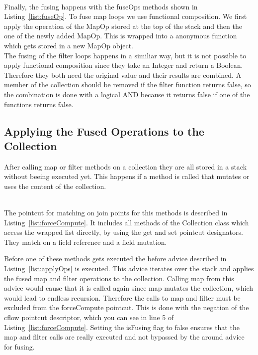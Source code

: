 \documentclass[runningheads,a4paper]{llncs}
\begin{document}
\lstset{caption=The fuseOp methods for MapOp and FilterOp objects. They combine the anonymous functions of both objects by functional composition or with logical and., language=Java, label=list:fuseOp}

\\
Finally, the fusing happens with the fuseOps methods shown in Listing~\ref{list:fuseOp}. To fuse map loops we use functional composition. We first apply the operation of the MapOp stored at the top of the stack and then the one of the newly added MapOp.
This is wrapped into a anonymous function which gets stored in a new MapOp object.\\
The fusing of the filter loops happens in a similiar way, but it is not possible to apply functional composition since they take an Integer and return a Boolean.
Therefore they both need the original value and their results are combined.
A member of the collection should be removed if the filter function returns false, so the combination is done with a logical AND because it returns false if one of the functions returns false.

\subsection{Applying the Fused Operations to the Collection} \label{sub:applying-ops}
After calling map or filter methods on a collection they are all stored in a stack without beeing executed yet. This happens if a method is called that mutates or uses the content of the collection.
\lstset{caption=Pointcut for reference or mutation to the list field of the Collection class. The pointcut for collectValues is to force the computation of the stored loops., language=AspectJ, label=list:forceCompute}

\\
The pointcut for matching on join points for this methods is described in Listing~\ref{list:forceCompute}.
It includes all methods of the Collection class which access the wrapped list directly, by using the get and set pointcut designators. They match on a field reference and a field mutation.
\\
\lstset{caption=Advice code which executes the stored operations., language=AspectJ, label=list:applyOps}

Before one of these methods gets executed the before advice described in Listing~\ref{list:applyOps} is executed.
This advice iterates over the stack and applies the fused map and filter operations to the collection.
Calling map from this advice would cause that it is called again since map mutates the collection, which would lead to endless recursion.
Therefore the calls to map and filter must be excluded from the forceCompute pointcut.
This is done with the negation of the cflow pointcut descriptor, which you can see in line 5 of Listing~\ref{list:forceCompute}.
Setting the isFusing flag to false ensures that the map and filter calls are really executed and not bypassed by the around advice for fusing.
\end{document}
